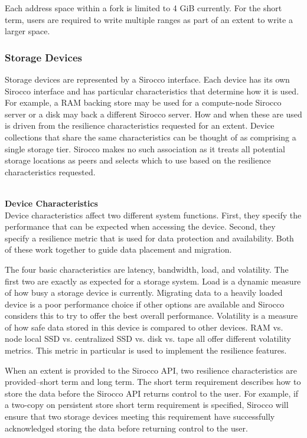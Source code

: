 Each address space within a fork is limited to 4 GiB currently. For the short
term, users are required to write multiple ranges as part of an extent to write
a larger space.

\subsubsection{Storage Devices}
Storage devices are represented by a Sirocco interface. Each device has its own
Sirocco interface and has particular characteristics that determine how it is
used. For example, a RAM backing store may be used for a compute-node Sirocco
server or a disk may back a different Sirocco server. How and when these are
used is driven from the resilience characteristics requested for an extent.
Device collections that share the same characteristics can be thought of as
comprising a single storage tier. Sirocco makes no such association as it
treats all potential storage locations as peers and selects which to use based
on the resilience characteristics requested.

~\\\noindent\textbf{Device Characteristics}\\
Device characteristics affect two different system functions. First, they
specify the performance that can be expected when accessing the device. Second,
they specify a resilience metric that is used for data protection and
availability. Both of these work together to guide data placement and
migration.

The four basic characteristics are latency, bandwidth, load, and volatility.
The first two are exactly as expected for a storage system. Load is a dynamic
measure of how busy a storage device is currently. Migrating data to a heavily
loaded device is a poor performance choice if other options are available and
Sirocco considers this to try to offer the best overall performance. Volatility
is a measure of how safe data stored in this device is compared to other
devices. RAM vs. node local SSD vs. centralized SSD vs. disk vs. tape all offer
different volatility metrics. This metric in particular is used to implement
the resilience features.

When an extent is provided to the Sirocco API, two resilience characteristics
are provided--short term and long term. The short term requirement describes
how to store the data before the Sirocco API returns control to the user. For
example, if a two-copy on persistent store short term requirement is specified,
Sirocco will ensure that two storage devices meeting this requirement have
successfully acknowledged storing the data before returning control to the
user.

